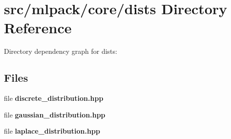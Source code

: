 \section{src/mlpack/core/dists Directory Reference}
\label{dir_47ddeeba9f5b7b3714cb3f4dfec86c00}
Directory dependency graph for dists\-:
\subsection*{Files}
\begin{DoxyCompactItemize}
\item 
file {\bf discrete\-\_\-distribution.\-hpp}
\item 
file {\bf gaussian\-\_\-distribution.\-hpp}
\item 
file {\bf laplace\-\_\-distribution.\-hpp}
\end{DoxyCompactItemize}
